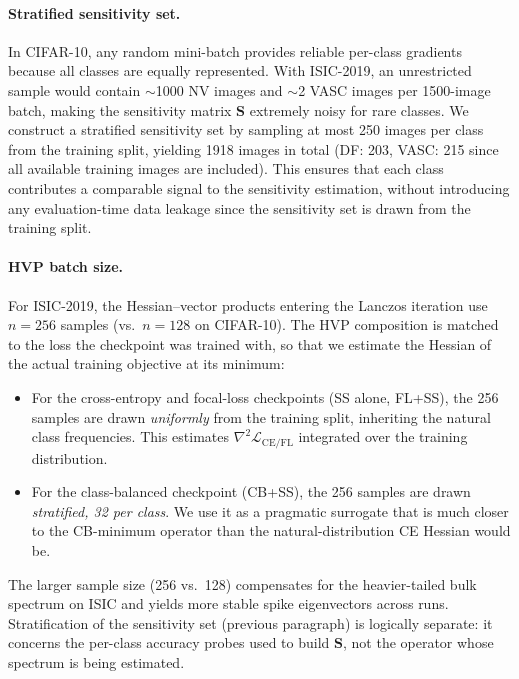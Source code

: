 \documentclass[11pt,a4paper]{article}
\newcommand{\mat}[1]{\bm{#1}}
\begin{document}
\paragraph{Stratified sensitivity set.}
In CIFAR-10, any random mini-batch provides reliable per-class gradients
because all classes are equally represented. With ISIC-2019, an
unrestricted sample would contain $\sim$1000 NV images and $\sim$2 VASC
images per 1500-image batch, making the sensitivity matrix $\mat{S}$
extremely noisy for rare classes. We construct a stratified sensitivity
set by sampling at most 250 images per class from the training split,
yielding 1918 images in total (DF: 203, VASC: 215 since all available
training images are included). This ensures that each class contributes
a comparable signal to the sensitivity estimation, without introducing
any evaluation-time data leakage since the sensitivity set is drawn from
the training split.

\paragraph{HVP batch size.}
For ISIC-2019, the Hessian--vector products entering the Lanczos
iteration use $n = 256$ samples (vs.\ $n = 128$ on CIFAR-10). The
HVP composition is matched to the loss the checkpoint was trained
with, so that we estimate the Hessian of the actual training
objective at its minimum:
\begin{itemize}
  \item For the cross-entropy and focal-loss checkpoints (SS alone,
    FL+SS), the 256 samples are drawn \emph{uniformly} from the
    training split, inheriting the natural class frequencies. This
    estimates $\nabla^2 \mathcal{L}_{\mathrm{CE/FL}}$ integrated over
    the training distribution.
    \item For the class-balanced checkpoint (CB+SS), the 256 samples are
    drawn \emph{stratified, 32 per class}. We use it as a
    pragmatic surrogate that is much closer to the CB-minimum operator
    than the natural-distribution CE Hessian would be.
\end{itemize}
The larger sample size (256 vs.\ 128) compensates for the
heavier-tailed bulk spectrum on ISIC and yields more stable spike
eigenvectors across runs. Stratification of the sensitivity set
(previous paragraph) is logically separate: it concerns the per-class
accuracy probes used to build $\mat{S}$, not the operator whose
spectrum is being estimated. 
\end{document}
